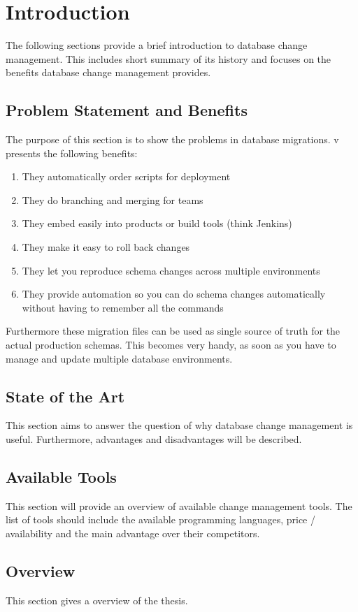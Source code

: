 

\chapter{Introduction}

The following sections provide a brief introduction to database change
management. This includes short summary of its history and focuses on
the benefits database change management provides.

\section{Problem Statement and Benefits}%
The purpose of this section is to show the problems in database migrations.
 v
\cite{Dillon2022} presents the following benefits:

\begin{enumerate}
    \item They automatically order scripts for deployment
    \item They do branching and merging for teams 
    \item They embed easily into products or build tools (think Jenkins)
    \item They make it easy to roll back changes
    \item They let you reproduce schema changes across multiple environments
    \item They provide automation so you can do schema changes automatically without having to remember all the commands
\end{enumerate}

Furthermore these migration files can be used as single source of truth for the actual production schemas.
This becomes very handy, as soon as you have to manage and update multiple database environments.

\section{State of the Art}%
This section aims to answer the question of why database change
management is useful.
Furthermore, advantages and disadvantages will be described.



\section{Available Tools}%
This section will provide an overview of available change management tools.
The list of tools should include the available programming languages, price / availability
and the main advantage over their competitors.


\section{Overview}%
This section gives a overview of the thesis.

\newpage